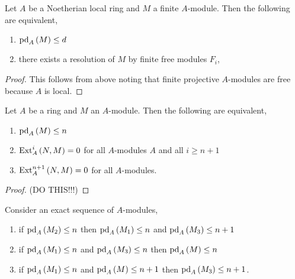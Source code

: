\documentclass[12pt]{article}
\begin{document}
\begin{lemma}
Let $A$ be a Noetherian local ring and $M$ a finite $A$-module. Then the following are equivalent,
\begin{enumerate}
\item $\mathrm{pd}_{A} \left( M \right) \le d$ 
\item there exists a resolution of $M$ by finite free modules $F_i$,
\begin{center}
\end{center}
\end{enumerate}
\end{lemma}

\begin{proof}
This follows from above noting that finite projective $A$-modules are free because $A$ is local.
\end{proof}

\begin{prop}
Let $A$ be a ring and $M$ an $A$-module. Then the following are equivalent,
\begin{enumerate}
\item $\mathrm{pd}_{A} \left( M \right) \le n$
\item $\mathrm{Ext}^{i}_{A} \left( N, M \right) = 0$ for all $A$-modules $A$ and all $i \ge n + 1$
\item $\mathrm{Ext}^{n+1}_{A} \left( N, M \right) = 0$ for all $A$-modules.
\end{enumerate}
\end{prop}

\begin{proof}
(DO THIS!!!)
\end{proof}

\begin{lemma}
Consider an exact sequence of $A$-modules,
\begin{center}
\end{center}
\begin{enumerate}
\item if $\mathrm{pd}_{A} \left( M_2 \right) \le n$ then $\mathrm{pd}_{A} \left( M_1 \right) \le n$ and $\mathrm{pd}_{A} \left( M_3 \right) \le n + 1$
\item if $\mathrm{pd}_{A} \left( M_1 \right) \le n$ and $\mathrm{pd}_{A} \left( M_3 \right) \le n$ then $\mathrm{pd}_{A} \left( M \right) \le n$
\item if $\mathrm{pd}_{A} \left( M_1 \right) \le n$ and $\mathrm{pd}_{A} \left( M \right) \le n + 1$ then $\mathrm{pd}_{A} \left( M_3 \right) \le n + 1$.
\end{enumerate}
\end{lemma}
\end{document}

